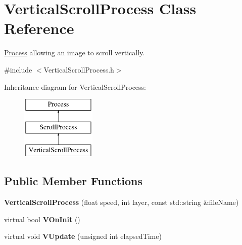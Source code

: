 \hypertarget{classVerticalScrollProcess}{\section{Vertical\-Scroll\-Process Class Reference}
\label{classVerticalScrollProcess}
}


\hyperlink{classProcess}{Process} allowing an image to scroll vertically.  




{\ttfamily \#include $<$Vertical\-Scroll\-Process.\-h$>$}

Inheritance diagram for Vertical\-Scroll\-Process\-:\begin{figure}[H]
\begin{center}
\leavevmode
\includegraphics[height=3.000000cm]{classVerticalScrollProcess}
\end{center}
\end{figure}
\subsection*{Public Member Functions}
\begin{DoxyCompactItemize}
\item 
\hypertarget{classVerticalScrollProcess_a8fc1be86ccd93698d0b3c5b2ba2d0e08}{{\bfseries Vertical\-Scroll\-Process} (float speed, int layer, const std\-::string \&file\-Name)}\label{classVerticalScrollProcess_a8fc1be86ccd93698d0b3c5b2ba2d0e08}

\item 
\hypertarget{classVerticalScrollProcess_ad87636bcc05f4e10020032fd96c54429}{virtual bool {\bfseries V\-On\-Init} ()}\label{classVerticalScrollProcess_ad87636bcc05f4e10020032fd96c54429}

\item 
\hypertarget{classVerticalScrollProcess_a3a27972872804bc16bfccc4e2f924a04}{virtual void {\bfseries V\-Update} (unsigned int elapsed\-Time)}\label{classVerticalScrollProcess_a3a27972872804bc16bfccc4e2f924a04}

\end{DoxyCompactItemize}

